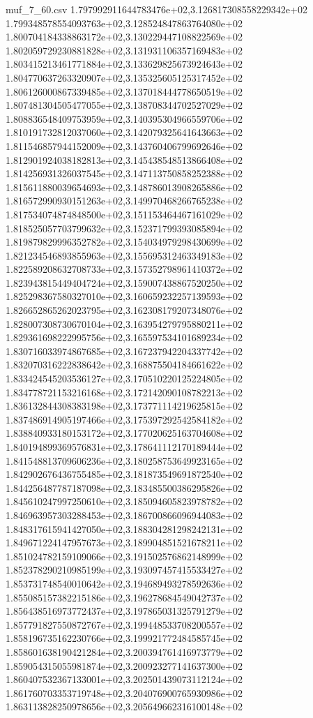 \begin{filecontents*}{muf_7_60.csv}
1.797992911644783476e+02,3.126817308558229342e+02
1.799348578554093763e+02,3.128524847863764080e+02
1.800704184338863172e+02,3.130229447108822569e+02
1.802059729230881828e+02,3.131931106357169483e+02
1.803415213461771884e+02,3.133629825673924643e+02
1.804770637263320907e+02,3.135325605125317452e+02
1.806126000867339485e+02,3.137018444778650519e+02
1.807481304505477055e+02,3.138708344702527029e+02
1.808836548409753959e+02,3.140395304966559706e+02
1.810191732812037060e+02,3.142079325641643663e+02
1.811546857944152009e+02,3.143760406799692646e+02
1.812901924038182813e+02,3.145438548513866408e+02
1.814256931326037545e+02,3.147113750858252388e+02
1.815611880039654693e+02,3.148786013908265886e+02
1.816572990930151263e+02,3.149970468266765238e+02
1.817534074874848500e+02,3.151153464467161029e+02
1.818525057703799632e+02,3.152371799393085894e+02
1.819879829996352782e+02,3.154034979298430699e+02
1.821234546893855963e+02,3.155695312463349183e+02
1.822589208632708733e+02,3.157352798961410372e+02
1.823943815449404724e+02,3.159007438867520250e+02
1.825298367580327010e+02,3.160659232257139593e+02
1.826652865262023795e+02,3.162308179207348076e+02
1.828007308730670104e+02,3.163954279795880211e+02
1.829361698222995756e+02,3.165597534101689234e+02
1.830716033974867685e+02,3.167237942204337742e+02
1.832070316222838642e+02,3.168875504184661622e+02
1.833424545203536127e+02,3.170510220125224805e+02
1.834778721153216168e+02,3.172142090108782213e+02
1.836132844308383198e+02,3.173771114219625815e+02
1.837486914905197466e+02,3.175397292542584182e+02
1.838840933180153172e+02,3.177020625163704608e+02
1.840194899369576831e+02,3.178641112170189444e+02
1.841548813709606236e+02,3.180258753649923165e+02
1.842902676436755485e+02,3.181873549691872540e+02
1.844256487787187098e+02,3.183485500386295826e+02
1.845610247997250610e+02,3.185094605823978782e+02
1.846963957303288453e+02,3.186700866096944083e+02
1.848317615941427050e+02,3.188304281298242131e+02
1.849671224147957673e+02,3.189904851521678211e+02
1.851024782159109066e+02,3.191502576862148999e+02
1.852378290210985199e+02,3.193097457415533427e+02
1.853731748540010642e+02,3.194689493278592636e+02
1.855085157382215186e+02,3.196278684549042737e+02
1.856438516973772437e+02,3.197865031325791279e+02
1.857791827550872767e+02,3.199448533708200557e+02
1.858196735162230766e+02,3.199921772484585745e+02
1.858601638190421284e+02,3.200394761416973779e+02
1.859054315055981874e+02,3.200923277141637300e+02
1.860407532367133001e+02,3.202501439073112124e+02
1.861760703353719748e+02,3.204076900765930986e+02
1.863113828250978656e+02,3.205649662316100148e+02

\end{filecontents*}
